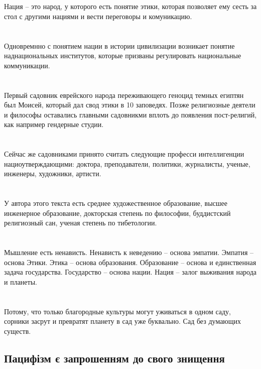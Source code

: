 \\
\\
Нация -- это народ, у которого есть понятие этики, которая позволяет ему сесть за стол с другими нациями и вести переговоры и комуникацию.\\
\\
\\
Одновремнно с понятием нации в истории цивилизации возникает понятие наднациональных институтов, которые призваны регулировать национальные коммуникации.\\
\\
\\
Первый садовник еврейского народа переживающего геноцид темных египтян был Моисей, который дал свод этики в 10 заповедях. Позже религиозные деятели и философы оставались главными садовникми вплоть до появления пост-религий, как например гендерные студии.\\
\\
\\
Сейчас же садовниками принято считать следующие професси интеллигенции нациоутверждающими: доктора, преподаватели, политики, журналисты, ученые, инженеры, художники, артисти.\\
\\
\\
У автора этого текста есть среднее художественное образование, высшее инженерное образование, докторская степень по философии, буддистский религиозный сан, ученая степень по тибетологии.\\
\\
\\
Мышление есть ненависть. Ненависть к неведению -- основа эмпатии. Эмпатия -- основа Этики. Этика -- основа образования. Образование -- основа и единственная задача государства. Государство -- основа нации. Нация -- залог выживания народа и планеты.\\
\\
\\
Потому, что только благородные культуры могут уживаться в одном саду, сорники засрут и превратят планету в сад уже буквально. Сад без думающих существ.\\

\subsection{Пацифізм є запрошенням до свого знищення}

